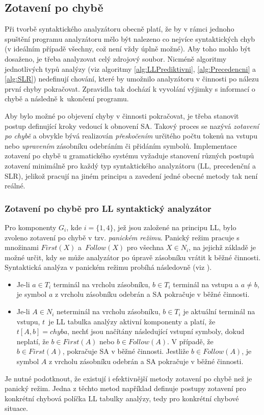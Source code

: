 \subsection*{Zotavení po chybě}
Při tvorbě syntaktického analyzátoru obecně platí, že by v rámci jednoho spuštění programu analyzátoru mělo být nalezeno co nejvíce syntaktických chyb (v ideálním případě všechny, což není vždy úplně možné).
Aby toho mohlo být dosaženo, je třeba analyzovat celý zdrojový soubor. Nicméně algoritmy jednotlivých typů analýzy (viz algoritmy
\ref{alg:LLPrediktivni}, \ref{alg:Precedencni} a \ref{alg:SLR}) nedefinují chování, které by umožnilo analyzátoru
v činnosti po nálezu první chyby pokračovat. Zpravidla tak dochází k vyvolání výjimky s informací o chybě a následně k~ukončení programu.

Aby bylo možné po objevení chyby v činnosti pokračovat, je třeba stanovit postup definující kroky vedoucí k obnovení SA. Takový proces se nazývá \emph{zotavení po chybě} a obvykle
bývá realizován \emph{přeskočením} určitého počtu tokenů na vstupu nebo \emph{upravením} zásobníku odebráním či přidáním symbolů. Implementace zotavení po chybě u gramatického systému vyžaduje stanovení
různých postupů zotavení minimálně pro každý typ syntaktického analyzátoru (LL, precedenční a SLR), jelikož pracují na jiném principu a zavedení jedné obecné metody tak není reálné.

\subsubsection*{Zotavení po chybě pro LL syntaktický analyzátor}
Pro komponenty $G_i$, kde $i = \{1, 4\}$, jež jsou založené na principu LL, bylo zvoleno zotavení po chybě v tzv. \emph{panickém režimu}. Panický režim pracuje s množinami $First(X)$ a~$Follow(X)$ pro všechna
$X \in N_i$, na jejichž základě je možné určit, kdy se může analyzátor po úpravě zásobníku vrátit k běžné činnosti. Syntaktická analýza v panickém režimu probíhá následovně (viz \cite{Meduna:2008:ElementsOfCompilerDesign}).
\begin{itemize}
  \item Je-li $a \in T_i$ terminál na vrcholu zásobníku, $b \in T_i$ terminál na vstupu a $a \neq b$, je symbol $a$ z vrcholu zásobníku odebrán a SA pokračuje v běžné činnosti.
  \item Je-li $A \in N_i$ neterminál na vrcholu zásobníku, $b \in T_i$ je aktuální terminál na vstupu, $t$~je LL tabulka analýzy aktivní komponenty a platí, že $t[A, b] = chyba$, nechť jsou načítány
  následující vstupní symboly, dokud neplatí, že $b \in First(A)$ nebo $b \in Follow(A)$. V případě, že $b \in First(A)$, pokračuje SA v běžné činnosti. Jestliže $b \in Follow(A)$, je symbol $A$ z vrcholu
  zásobníku odebrán a SA pokračuje v běžné činnosti.
\end{itemize}
Je nutné podotknout, že existují i efektivnější metody zotavení po chybě než je panický režim. Jedna z těchto metod například definuje postupy zotavení pro konkrétní chybová políčka LL tabulky analýzy, tedy pro konkrétní
chybové situace.

